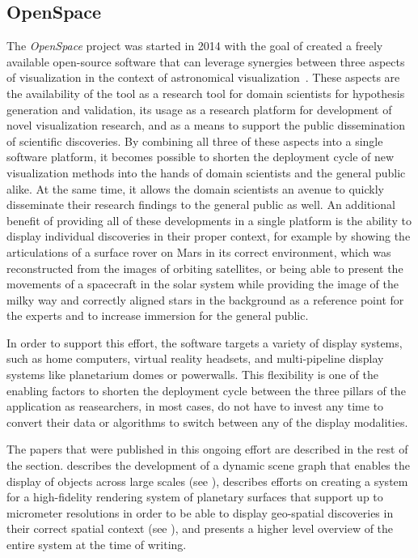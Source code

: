 \subsection{OpenSpace} \label{contributions:astro:openspace}
The \emph{OpenSpace} project was started in 2014 with the goal of created a freely available open-source software that can leverage synergies between three aspects of visualization in the context of astronomical visualization~\cite{bock17openspace}.  These aspects are the availability of the tool as a research tool for domain scientists for hypothesis generation and validation, its usage as a research platform for development of novel visualization research, and as a means to support the public dissemination of scientific discoveries.  By combining all three of these aspects into a single software platform, it becomes possible to shorten the deployment cycle of new visualization methods into the hands of domain scientists and the general public alike.  At the same time, it allows the domain scientists an avenue to quickly disseminate their research findings to the general public as well.  An additional benefit of providing all of these developments in a single platform is the ability to display individual discoveries in their proper context, for example by showing the articulations of a surface rover on Mars in its correct environment, which was reconstructed from the images of orbiting satellites, or being able to present the movements of a spacecraft in the solar system while providing the image of the milky way and correctly aligned stars in the background as a reference point for the experts and to  increase immersion for the general public.

In order to support this effort, the software targets a variety of display systems, such as home computers, virtual reality headsets, and multi-pipeline display systems like planetarium domes or powerwalls.  This flexibility is one of the enabling factors to shorten the deployment cycle between the three pillars of the application as reasearchers, in most cases, do not have to invest any time to convert their data or algorithms to switch between any of the display modalities.

The papers that were published in this ongoing effort are described in the rest of the section.   describes the development of a dynamic scene graph that enables the display of objects across large scales (see ),  describes efforts on creating a system for a high-fidelity rendering system of planetary surfaces that support up to micrometer resolutions in order to be able to display geo-spatial discoveries in their correct spatial context (see ), and  presents a higher level overview of the entire system at the time of writing.

